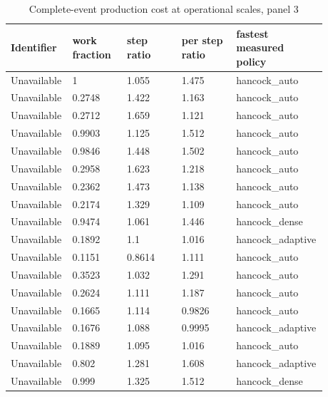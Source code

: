 \begin{longtable}{p{0.1760\linewidth}p{0.1760\linewidth}p{0.1760\linewidth}p{0.1760\linewidth}p{0.1760\linewidth}}
\caption{Complete-event production cost at operational scales, panel 3}\\
\hline
Identifier & work fraction & step ratio & per step ratio & fastest measured policy \\
\hline\endhead
Unavailable & 1 & 1.055 & 1.475 & hancock\_auto \\
Unavailable & 0.2748 & 1.422 & 1.163 & hancock\_auto \\
Unavailable & 0.2712 & 1.659 & 1.121 & hancock\_auto \\
Unavailable & 0.9903 & 1.125 & 1.512 & hancock\_auto \\
Unavailable & 0.9846 & 1.448 & 1.502 & hancock\_auto \\
Unavailable & 0.2958 & 1.623 & 1.218 & hancock\_auto \\
Unavailable & 0.2362 & 1.473 & 1.138 & hancock\_auto \\
Unavailable & 0.2174 & 1.329 & 1.109 & hancock\_auto \\
Unavailable & 0.9474 & 1.061 & 1.446 & hancock\_dense \\
Unavailable & 0.1892 & 1.1 & 1.016 & hancock\_adaptive \\
Unavailable & 0.1151 & 0.8614 & 1.111 & hancock\_auto \\
Unavailable & 0.3523 & 1.032 & 1.291 & hancock\_auto \\
Unavailable & 0.2624 & 1.111 & 1.187 & hancock\_auto \\
Unavailable & 0.1665 & 1.114 & 0.9826 & hancock\_auto \\
Unavailable & 0.1676 & 1.088 & 0.9995 & hancock\_adaptive \\
Unavailable & 0.1889 & 1.095 & 1.016 & hancock\_auto \\
Unavailable & 0.802 & 1.281 & 1.608 & hancock\_adaptive \\
Unavailable & 0.999 & 1.325 & 1.512 & hancock\_dense \\
\end{longtable}
